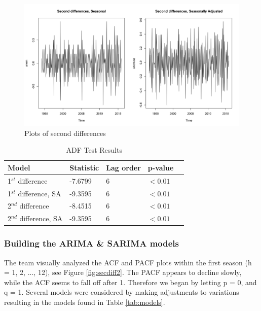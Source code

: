 {								 \begin{figure}[H]
							\centering
							\includegraphics[width=.6\linewidth]{images/secdiff}
							\caption{Plots of second differences}
							\label{fig:secdiff}
						\end{figure}

	 \begin{table}[H]
		 \centering
		 \caption{ADF Test Results}
		 \label{tab:ADF}
		 \begin{tabular}{lllll}
		 \hline
		 \textbf{Model} & \textbf{Statistic} & \textbf{Lag order} & \textbf{p-value}\\ \hline
		 1\(^{st}\) difference &  -7.6799 & 6 & \( < 0.01\)\\
		  1\(^{st}\) difference, SA &  -9.3595 & 6 &\( < 0.01\)\\
		 2\(^{nd}\) difference &  -8.4515 & 6 & \( < 0.01\)\\
		  2\(^{nd}\) difference, SA &  -9.3595 & 6 & \( < 0.01\)\\		 \hline
		 \end{tabular}
		 \end{table}

  
  \subsubsection*{Building the ARIMA \& SARIMA models}
  The team visually analyzed the ACF and PACF plots within the first season (h = 1, 2, ..., 12), see Figure \ref{fig:secdiff2}. The PACF appears to decline slowly, while the ACF seems to fall off after 1. Therefore we began by letting p = 0, and q = 1. Several models were considered by making adjustments to variations resulting in the models found in Table \ref{tab:models}.\newline
  
}

